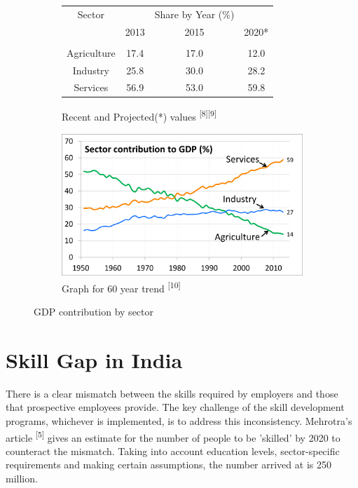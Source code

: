 \documentclass[a4paper, 10pt]{article}
\begin{document}
\begin{figure}[H]
\centering

\begin{subfigure}[b]{0.75\textwidth}
	\begin{tabular}{c | c c c}
	Sector & & Share by Year (\%) & \\
	& 2013 & 2015 & 2020* \\ \hline \\
	Agriculture & 17.4 & 17.0 & 12.0 \\
	Industry & 25.8 & 30.0 & 28.2 \\
	Services & 56.9 & 53.0 & 59.8 \\
	\end{tabular}
	\caption{Recent and Projected(*) values \textsuperscript{[8][9]}}
\end{subfigure}

\begin{subfigure}[b]{0.75\textwidth}
	\centerline{
		\includegraphics[scale=4]{gdptrend.png}
	}
	\caption{Graph for 60 year trend \textsuperscript{[10]}}
\end{subfigure}
    \label{fig:gdptrend}
	\caption{GDP contribution by sector}
\end{figure}

\section*{Skill Gap in India}
There is a clear mismatch between the skills required by employers and those that prospective employees provide. The key challenge of the skill development programs, whichever is implemented, is to address this inconsistency. Mehrotra's article \textsuperscript{[5]} gives an estimate for the number of people to be 'skilled' by 2020 to counteract the mismatch. Taking into account education levels, sector-specific requirements and making certain assumptions, the number arrived at is 250 million. \\
\end{document}
